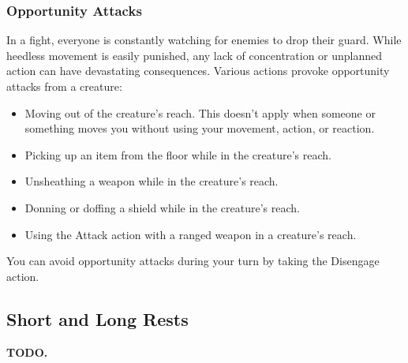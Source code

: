 \subsubsection*{Opportunity Attacks} \label{rule::opportunityattacks}
    In a fight, everyone is constantly watching for enemies to drop their guard.
    While heedless movement is easily punished, any lack of concentration or unplanned action can have devastating consequences.
    Various actions provoke opportunity attacks from a creature:
    \begin{itemize}
        \item Moving out of the creature's reach.
        This doesn't apply when someone or something moves you without using your movement, action, or reaction.
        \item Picking up an item from the floor while in the creature's reach.
        \item Unsheathing a weapon while in the creature's reach.
        \item Donning or doffing a shield while in the creature's reach.
        \item Using the Attack action with a ranged weapon in a creature's reach.
    \end{itemize}
    You can avoid opportunity attacks during your turn by taking the Disengage action.

\subsection*{Short and Long Rests} \label{ssec::shortandlongrests}
    \textbf{TODO.}
